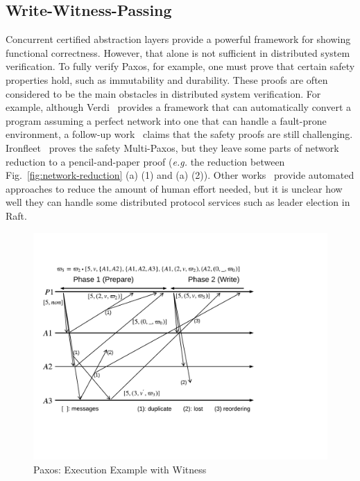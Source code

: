 \subsection{Write-Witness-Passing}
\label{subsec:witness-write}

Concurrent certified abstraction layers provide a powerful framework for showing functional correctness.
However, that alone is not sufficient in distributed system verification.
To fully verify Paxos, for example, one must prove that certain safety properties hold, such as immutability and durability.
These proofs are often considered to be the main obstacles in distributed system verification.
For example, although Verdi~\cite{verdi} provides a framework
that can automatically convert a program assuming a perfect network
into one that can handle a fault-prone environment,
a follow-up work~\cite{cppraft} claims that the safety proofs are still challenging.
Ironfleet~\cite{ironfleet} proves the safety Multi-Paxos,
but they leave some parts of network reduction to a pencil-and-paper proof
(\textit{e.g.} the reduction between Fig.~\ref{fig:network-reduction} (a) (1) and (a) (2)).
Other works~\cite{EPRdistributed, modular} provide automated approaches to reduce the amount of human effort needed,
but it is unclear how well they can handle some distributed protocol services such as leader election in Raft.

\begin{figure}
\begin{center}
\includegraphics[scale=.34]{figs/paxos_example_witness}
\end{center}
\caption{Paxos: Execution Example with Witness}
\label{fig:paxos-example-with-witness}
\end{figure}


